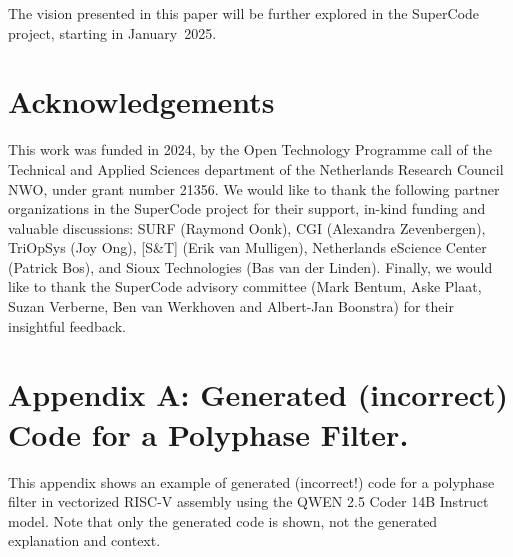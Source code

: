 \documentclass[a4wide,twocolumn]{article}
\begin{document}
The vision presented in this paper will be further explored in the SuperCode project, starting in January~2025.

\section*{Acknowledgements}
This work was funded in 2024, by the Open Technology Programme call of the Technical and Applied Sciences department of the Netherlands Research Council NWO, under grant number 21356. We would like to thank the following partner organizations in the SuperCode project for their support, in-kind funding and valuable discussions: SURF (Raymond Oonk), CGI (Alexandra Zevenbergen), TriOpSys (Joy Ong), [S\&T] (Erik van Mulligen), Netherlands eScience Center (Patrick Bos), and Sioux Technologies (Bas van der Linden). Finally, we would like to thank the SuperCode advisory committee (Mark Bentum, Aske Plaat, Suzan Verberne, Ben van Werkhoven and Albert-Jan Boonstra) for their insightful feedback. 




\newpage
\onecolumn
\section{Appendix A: Generated (incorrect) Code for a Polyphase Filter.}
\label{sec:appendix}

This appendix shows an example of generated (incorrect!) code for a polyphase filter in vectorized RISC-V assembly using the QWEN 2.5 Coder 14B Instruct model. Note that only the generated code is shown, not the generated explanation and context.
 \\
 
\end{document}
